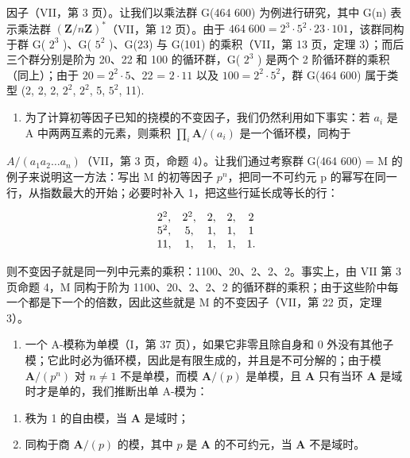 因子（VII，第 3 页）。让我们以乘法群 G(464 600) 为例进行研究，其中 G(n) 表示乘法群 \((\mathbf{Z}/n\mathbf{Z})^{*}\)（VII，第 12 页）。由于 \(464\;600 = 2^{3}\cdot5^{2}\cdot23\cdot101\)，该群同构于群 G( \(2^{3}\) )、G( \(5^{2}\) )、G(23) 与 G(101) 的乘积（VII，第 13 页，定理 3）；而后三个群分别是阶为 20、22 和 100 的循环群，G( \(2^{3}\) ) 是两个 2 阶循环群的乘积（同上）；由于 \(20 = 2^{2}\cdot5\)、22 = \(2\cdot 11\) 以及 \(100 = 2^{2}\cdot5^{2}\)，群 G(464 600) 属于类型 (2, 2, 2, \(2^{2}\), \(2^{2}\), 5, \(5^{2}\), 11).

\begin{enumerate}
\def\labelenumi{\arabic{enumi})}
\setcounter{enumi}{2}
\tightlist
\item
  为了计算初等因子已知的挠模的不变因子，我们仍然利用如下事实：若 \(a_{i}\) 是 A 中两两互素的元素，则乘积 \(\prod_{i}\mathbf{A}/(a_{i})\) 是一个循环模，同构于
\end{enumerate}

\(A/(a_{1}a_{2}\ldots a_{n})\)（VII，第 3 页，命题 4）。让我们通过考察群 G(464 600) = M 的例子来说明这一方法：写出 M 的初等因子 \(p^{n}\)，把同一不可约元 p 的幂写在同一行，从指数最大的开始；必要时补入 1，把这些行延长成等长的行：

\[
\begin{array}{c c c c c} 2 ^ {2}, & 2 ^ {2}, & 2, & 2, & 2 \\ 5 ^ {2}, & 5, & 1, & 1, & 1 \\ 11, & 1, & 1, & 1, & 1. \end{array}
\]

则不变因子就是同一列中元素的乘积：1100、20、2、2、2。事实上，由 VII 第 3 页命题 4，M 同构于阶为 1100、20、2、2、2 的循环群的乘积；由于这些阶中每一个都是下一个的倍数，因此这些就是 M 的不变因子（VII，第 22 页，定理 3）。

\begin{enumerate}
\def\labelenumi{\arabic{enumi})}
\setcounter{enumi}{3}
\tightlist
\item
  一个 A-模称为单模（I，第 37 页），如果它非零且除自身和 0 外没有其他子模；它此时必为循环模，因此是有限生成的，并且是不可分解的；由于模 \(\mathbf{A} / (p^n)\) 对 \(n \neq 1\) 不是单模，而模 \(\mathbf{A} / (p)\) 是单模，且 \(\mathbf{A}\) 只有当环 \(\mathbf{A}\) 是域时才是单的，我们推断出单 A-模为：
\end{enumerate}

\begin{enumerate}
\def\labelenumi{\alph{enumi})}
\item
  秩为 1 的自由模，当 \(\mathbf{A}\) 是域时；
\item
  同构于商 \(\mathbf{A} / (p)\) 的模，其中 \(p\) 是 \(\mathbf{A}\) 的不可约元，当 \(\mathbf{A}\) 不是域时。
\end{enumerate}

